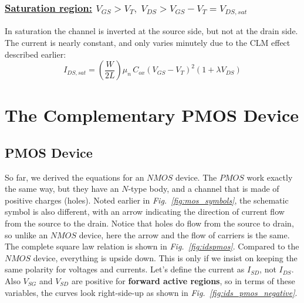 \subsubsection{\textbf{\underline{Saturation region:}} $V_{GS} > V_T,\;V_{DS} > V_{GS} - V_T = V_{DS,sat}$}
\vspace{0.1cm}
In saturation the channel is inverted at the source side, but not at the drain side.  The current is nearly constant, and only varies minutely due to the CLM effect described earlier:
    \begin{equation}
        \boxed{I_{DS,sat} = \left(\frac{W}{2L}\right) \mu_n\,C_{ox} {\left(V_{GS} - {V_T}\right)}^2 (1 + \lambda V_{DS})}
        \label{eq:mosfet_ids}
    \end{equation}
\section{The Complementary PMOS Device}
\subsection{PMOS Device}
So far, we derived the equations for an $NMOS$ device.  The $PMOS$ work exactly the same way, but they have an $N$-type body, and a channel that is made of positive charges (holes).  Noted earlier in \emph{Fig.~\ref{fig:mos_symbols}}, the schematic symbol is also different, with an arrow indicating the direction of current flow from the source to the drain.  Notice that holes do flow from the source to drain, so unlike an $NMOS$ device, here the arrow and the flow of carriers is the same.  The complete square law relation is shown in \emph{Fig.~\ref{fig:idspmos}}.  Compared to the $NMOS$ device, everything is upside down. This is only if we insist on keeping the same polarity for voltages and currents.  Let's define the current as $I_{SD}$, not $I_{DS}$.   Also $V_{SG}$ and $V_{SD}$ are positive for \textbf{forward active regions}, so in terms of these variables, the curves look right-side-up as shown in \emph{Fig.~\ref{fig:ids_pmos_negative}}.

